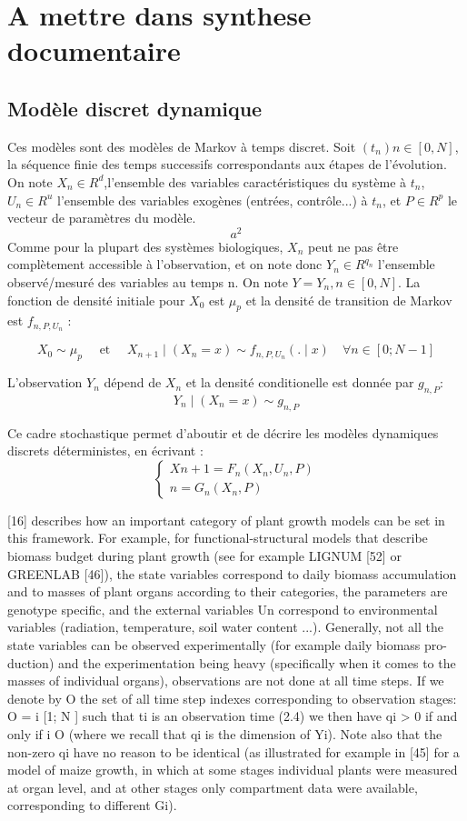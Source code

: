\documentclass[12pt,oneside,a4paper]{article}
\begin{document}
\section{A mettre dans synthese documentaire}
\subsection{Modèle discret dynamique}

Ces modèles sont des modèles de Markov à temps discret. Soit $(t_{n}) n \in [0,N]$, la séquence finie des temps successifs correspondants aux étapes de l’évolution. On note $X_{n}\in R^d$,l'ensemble des variables caractéristiques du système à $t_{n}$, $U_n \in R^u$  l'ensemble des variables exogènes (entrées, contrôle...) à $t_{n}$, et $P\in R^p$ le vecteur de paramètres du modèle.
\[ a^2 \]
Comme pour la plupart des systèmes biologiques, $X_{n}$ peut ne pas être complètement accessible à l'observation, et on note donc $Y_n \in R^{q_n}$ l'ensemble observé/mesuré des variables au temps n. On note $Y=Y_n, n \in [0,N]$. La fonction de densité initiale pour $X_0$ est $\mu_p$ et la densité de transition de Markov est $f_{n,P,U_n}$ :

\[
	X_0 \sim \mu_p \quad \text{ et } \quad
	 X_{n+1} \mid (X_n=x) \sim f_{n,P,U_n}(.\mid x)				\quad \forall n \in [0;N-1]
\]

L'observation $Y_n$ dépend de $X_n$ et la densité conditionelle est donnée par $g_{n,P}$:
\[Y_n \mid (X_n = x) \sim g_{n,P}\]

Ce cadre stochastique permet d'aboutir et de décrire les modèles dynamiques discrets déterministes, en écrivant : 
\[
\left\{
    \begin{array}{ll}
        Xn+1 = F_n(X_n,U_n,P) 	 \\
        n =G_n(X_n,P)
    \end{array}
\right.
\]

[16] describes how an important category of plant growth models can be set in this framework. For example, for functional-structural models that describe biomass budget during plant growth (see for example LIGNUM [52] or GREENLAB [46]), the state variables correspond to daily biomass accumulation and to masses of plant organs according to their categories, the parameters are genotype specific, and the external variables Un correspond to environmental variables (radiation, temperature, soil water content ...).
Generally, not all the state variables can be observed experimentally (for example daily biomass pro- duction) and the experimentation being heavy (specifically when it comes to the masses of individual organs), observations are not done at all time steps. If we denote by O the set of all time step indexes corresponding to observation stages:
O = {i  [1; N ] such that ti is an observation time} (2.4)
we then have qi > 0 if and only if i  O (where we recall that qi is the dimension of Yi). Note also that the non-zero qi have no reason to be identical (as illustrated for example in [45] for a model of maize growth, in which at some stages individual plants were measured at organ level, and at other stages only compartment data were available, corresponding to different Gi).
\end{document}
